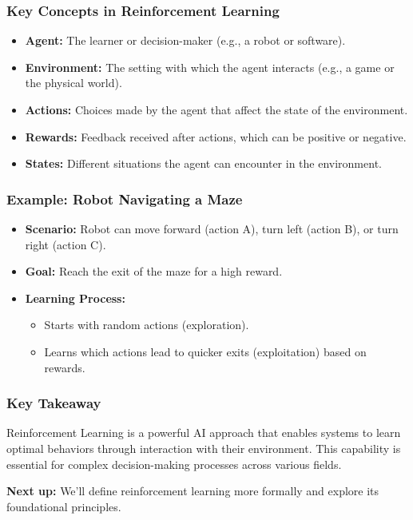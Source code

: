 \documentclass[aspectratio=169]{beamer}
\begin{document}
\begin{frame}[fragile]
    \frametitle{Key Concepts in Reinforcement Learning}
    \begin{itemize}
        \item \textbf{Agent:} The learner or decision-maker (e.g., a robot or software).
        \item \textbf{Environment:} The setting with which the agent interacts (e.g., a game or the physical world).
        \item \textbf{Actions:} Choices made by the agent that affect the state of the environment.
        \item \textbf{Rewards:} Feedback received after actions, which can be positive or negative.
        \item \textbf{States:} Different situations the agent can encounter in the environment.
    \end{itemize}
\end{frame}

\begin{frame}[fragile]
    \frametitle{Example: Robot Navigating a Maze}
    \begin{itemize}
        \item \textbf{Scenario:} Robot can move forward (action A), turn left (action B), or turn right (action C).
        \item \textbf{Goal:} Reach the exit of the maze for a high reward.
        \item \textbf{Learning Process:}
        \begin{itemize}
            \item Starts with random actions (exploration).
            \item Learns which actions lead to quicker exits (exploitation) based on rewards.
        \end{itemize}
    \end{itemize}
\end{frame}

\begin{frame}[fragile]
    \frametitle{Key Takeaway}
    Reinforcement Learning is a powerful AI approach that enables systems to learn optimal behaviors through interaction with their environment. This capability is essential for complex decision-making processes across various fields.
    
    \textbf{Next up:} We'll define reinforcement learning more formally and explore its foundational principles.
\end{frame}
\end{document}
